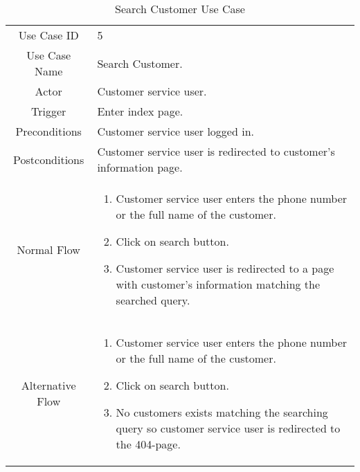 	\begin{table}[H]
		\centering
		\renewcommand{\arraystretch}{1.5}
		\begin{tabular}[t]{ c  m{10cm} }
			Use Case ID & 5  \\
			Use Case Name & Search Customer. \\
			Actor & Customer service user. \\
			Trigger & Enter index page. \\
			Preconditions & Customer service user logged in. \\
			Postconditions & Customer service user is redirected to customer's information page. \\
			Normal Flow &\begin{enumerate}
				\item Customer service user enters the phone number or the full name of the customer.
				\item Click on search button.
				\item Customer service user is redirected to a page with customer's information matching the searched query.
			\end{enumerate}\\
			Alternative Flow &\begin{enumerate}
				\item Customer service user enters the phone number or the full name of the customer.
				\item Click on search button.
				\item No customers exists matching the searching query so customer service user is redirected to the 404-page.
			\end{enumerate} \\
		\end{tabular}
		\caption{Search Customer Use Case}
		\renewcommand{\arraystretch}{1.0}
	\end{table}
	
